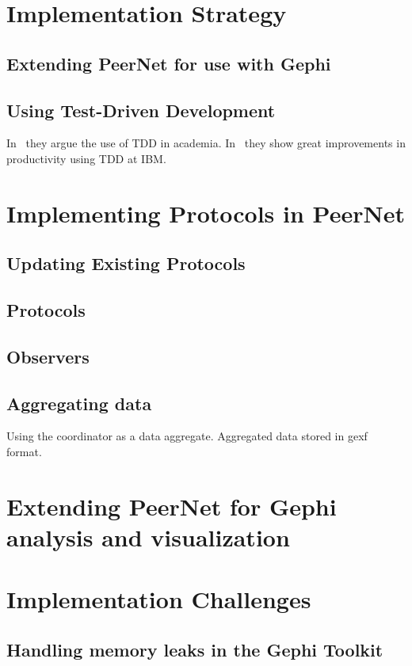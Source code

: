 \section{Implementation Strategy}
    \subsection{Extending PeerNet for use with Gephi}
    \subsection{Using Test-Driven Development}
    In~\cite{janzen2005test} they argue the use of TDD in academia.
    In~\cite{maximilien2003assessing} they show great improvements
    in productivity using TDD at IBM.\

\section{Implementing Protocols in PeerNet}
    \subsection{Updating Existing Protocols}
    \subsection{Protocols}
    \subsection{Observers}
    \subsection{Aggregating data}
        Using the coordinator as a data aggregate. Aggregated data
        stored in gexf format.

\section{Extending PeerNet for Gephi analysis and visualization}

\section{Implementation Challenges}
\subsection{Handling memory leaks in the Gephi Toolkit}
